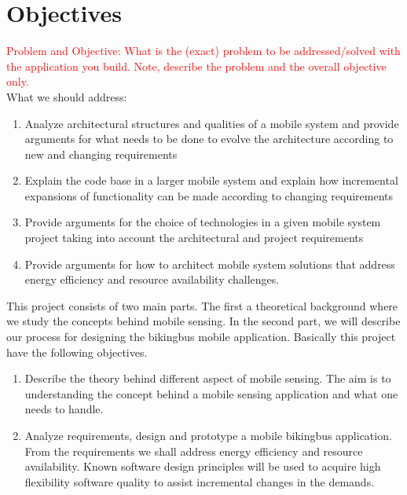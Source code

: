 \section{Objectives}
\textcolor{red}{Problem and Objective: What is the (exact) problem to be addressed/solved with the application you build. Note, describe the problem and the overall objective only.}\\

\noindent
What we should address:
\begin{enumerate}
    \item  Analyze architectural structures and qualities of a mobile system and provide arguments for what needs to be done to evolve the architecture according to new and changing requirements
            
    \item  Explain the code base in a larger mobile system and explain how incremental expansions of functionality can be made according to changing requirements
    
    \item   Provide arguments for the choice of technologies in a given mobile system project taking into account the architectural and project requirements
    
    \item Provide arguments for how to architect mobile system solutions that address energy efficiency and resource availability challenges. 
\end{enumerate}








\noindent
This project consists of two main parts. The first a theoretical background where we study the concepts behind mobile sensing. In the second part, we will describe our process for designing the bikingbus mobile application. Basically this project have the following objectives. 

\begin{enumerate}
    \item   Describe the theory behind different aspect of mobile sensing. The aim is to understanding the concept behind a mobile sensing application and what one needs to handle. 
            
    \item  Analyze requirements, design and prototype a mobile bikingbus application. From the requirements we shall address energy efficiency and resource availability. Known software design principles will be used to acquire high flexibility software quality to assist incremental changes in the demands. 

\end{enumerate}


